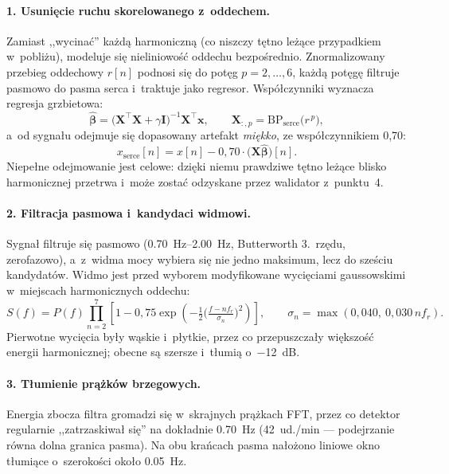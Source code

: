 \documentclass[12pt,a4paper,oneside]{report}
\begin{document}
\paragraph{1. Usunięcie ruchu skorelowanego z~oddechem.}
Zamiast ,,wycinać'' każdą harmoniczną (co niszczy tętno leżące przypadkiem
w~pobliżu), modeluje się nieliniowość oddechu bezpośrednio. Znormalizowany
przebieg oddechowy $r[n]$ podnosi się do potęg $p = 2,\dots,6$, każdą potęgę
filtruje pasmowo do pasma serca i~traktuje jako regresor. Współczynniki
wyznacza regresja grzbietowa:
\begin{equation}
  \hat{\boldsymbol\beta} = \big(\mathbf{X}^{\!\top}\mathbf{X} + \gamma \mathbf{I}\big)^{-1}
  \mathbf{X}^{\!\top} \mathbf{x},
  \qquad
  \mathbf{X}_{:,p} = \mathrm{BP}_{\text{serce}}\big(r^{\,p}\big),
  \label{eq:regresja}
\end{equation}
a~od sygnału odejmuje się dopasowany artefakt \emph{miękko}, ze współczynnikiem
0{,}70:
\begin{equation}
  x_{\text{serce}}[n] = x[n] - 0{,}70 \cdot \big(\mathbf{X}\hat{\boldsymbol\beta}\big)[n].
  \label{eq:miekkie-odejmowanie}
\end{equation}
Niepełne odejmowanie jest celowe: dzięki niemu prawdziwe tętno leżące blisko
harmonicznej przetrwa i~może zostać odzyskane przez walidator z~punktu~4.

\paragraph{2. Filtracja pasmowa i~kandydaci widmowi.}
Sygnał filtruje się pasmowo (\SIrange{0.70}{2.00}{Hz}, Butterworth 3.~rzędu,
zerofazowo), a~z~widma mocy wybiera się nie jedno maksimum, lecz do sześciu
kandydatów. Widmo jest przed wyborem modyfikowane wycięciami gaussowskimi
w~miejscach harmonicznych oddechu:
\begin{equation}
  S(f) = P(f) \prod_{n=2}^{7}
  \left[ 1 - 0{,}75 \exp\!\left( -\tfrac{1}{2}\Big(\tfrac{f - n f_r}{\sigma_n}\Big)^{\!2} \right) \right],
  \qquad \sigma_n = \max(0{,}040,\ 0{,}030\, n f_r).
  \label{eq:notch}
\end{equation}
Pierwotne wycięcia były wąskie i~płytkie, przez co przepuszczały większość
energii harmonicznej; obecne są szersze i~tłumią o~\SI{-12}{dB}.

\paragraph{3. Tłumienie prążków brzegowych.}
Energia zbocza filtra gromadzi się w~skrajnych prążkach FFT, przez co detektor
regularnie ,,zatrzaskiwał się'' na dokładnie \SI{0.70}{Hz} (42~ud./min ---
podejrzanie równa dolna granica pasma). Na obu krańcach pasma nałożono
liniowe okno tłumiące o~szerokości około \SI{0.05}{Hz}.
\end{document}
